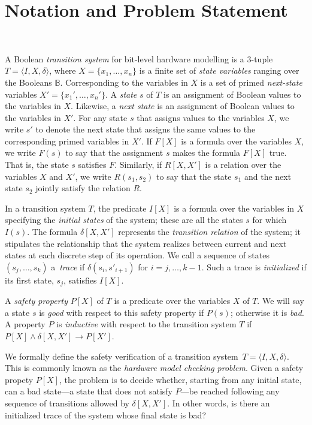 \section{Notation and Problem Statement}~\label{sec:notation}

A Boolean \textit{transition system} for bit-level hardware
modelling is a 3-tuple $T = \langle I,X,\delta \rangle$, where $X = \{x_1,\dots ,x_n\}$
is a finite set of \textit{state variables} ranging over the Booleans $\mathbb{B}$. 
%
Corresponding to the variables in $X$ is a set of primed \textit{next-state} variables  $X' = \{x_1', \dots, x_n'\}$.
% 
A \textit{state} $s$ of $T$ is an assignment of Boolean values to the variables in $X$. Likewise, a \textit{next state} is an assignment of Boolean values to the variables in $X'$.  For any state $s$ that assigns values to the  variables $X$, we write $s'$ to denote the next state that assigns the same values to the corresponding primed variables in $X'$. If $F[X]$ is a formula over the variables $X$, we write $F(s)$ to say that
the assignment $s$ makes the formula $F[X]$ true. That is, the state $s$ satisfies $F$. Similarly, if $R[X,X']$ is a relation over the variables $X$ and $X'$, we write $R(s_1,s_2)$ to say that the state $s_1$ and the next state $s_2$ jointly satisfy the relation $R$.

In a transition system $T$, the predicate $I[X]$ is a formula over
the variables in $X$ specifying the \textit{initial states} of the system; these are all the states $s$ for which
$I(s)$. The formula $\delta[X,X']$ represents the \textit{transition relation} of the system; it stipulates the relationship that the system 
realizes between current and next states at each discrete step of its operation. 
% 
We call a sequence of states $(s_j,\dots,s_k)$ a~\textit{trace} 
if $\delta(s_i,s'_{i{+}1})$ for $i=j,\dots,k-1$.  Such a trace is 
\textit{initialized} if its first state, $s_j$, satisfies $I[X]$.  
  
A \textit{safety property} $P[X]$ of $T$ is a predicate over the
variables $X$ of $T$.  We will say a state $s$ is \textit{good} with respect to this safety property if 
$P(s)$; otherwise it is \textit{bad}. A property $P$ is \textit{inductive} with respect to the transition system $T$ if $P[X] \wedge \delta[X,X'] \rightarrow P[X']$.    
%

We formally define the safety verification of a transition system~$T = \langle I,X,\delta\rangle$.
This is commonly known as the \textit{hardware model checking problem}.  
Given a safety propety $P[X]$, the problem is to decide whether, starting from any initial state, can a bad state---a state that does not satisfy $P$---be reached following any sequence of transitions allowed by $\delta[X,X']$. In other words, is there an initialized trace of the system whose
final state is bad?
%
